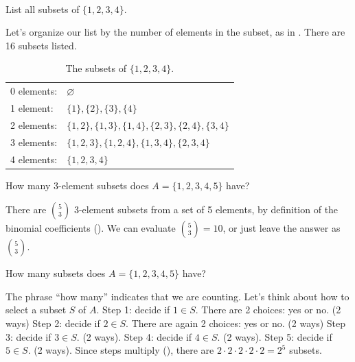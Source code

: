 \begin{exam}[Subsets]
\label{exam_subsets}
~
    \begin{apart}
        \item List all subsets of $\{1,2,3,4\}$.
            \begin{soln}
                Let's organize our list by the number of elements in the subset, as in .  There are 16 subsets listed.

                \begin{table}[hbtp]
                    \centering
                    \begin{tabular}{ll}
                         0 elements: & $\varnothing$ \\
                         1 element: & $\{1\}, \{2\},\{3\},\{4\}$ \\
                         2 elements: & $\{1,2\}, \{1,3\},\{1,4\},\{2,3\},\{2,4\},\{3,4\}$ \\
                         3 elements: & $\{1,2,3\}, \{1,2,4\},\{1,3,4\},\{2,3,4\}$ \\
                         4 elements: & $\{1,2,3,4\}$
                    \end{tabular}
                    \caption{The subsets of $\{1,2,3,4\}$.}
                    \label{table_subsets_1234}
                \end{table}
            \end{soln}
        \item How many 3-element subsets does $A = \{1,2,3,4,5\}$ have?
            \begin{soln}
                There are $\binom{5}{3}$ 3-element subsets from a set of 5 elements, by definition of the binomial coefficients ().  We can evaluate $\binom{5}{3}=10$, or just leave the answer as $\binom{5}{3}$.
            \end{soln}
        \item \label{part_number_subsets} How many subsets does $A = \{1,2,3,4,5\}$ have?
            \begin{soln}
                The phrase ``how many'' indicates that we are counting.  Let's think about how to select a subset $S$ of $A$.  Step 1: decide if $1 \in S$.  There are 2 choices: yes or no. (2 ways)  Step 2: decide if $2 \in S$.  There are again 2 choices: yes or no. (2 ways) Step 3: decide if $3 \in S$. (2 ways). Step 4: decide if $4 \in S$. (2 ways).  Step 5: decide if $5 \in S$. (2 ways). Since steps multiply (), there are $2\cdot 2 \cdot 2 \cdot 2 \cdot 2 = 2^5$ subsets.

            \end{soln}
    \end{apart}
\end{exam}

